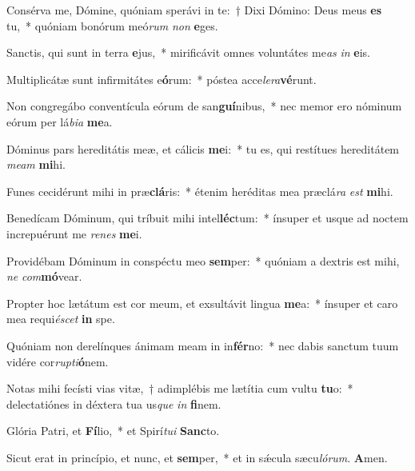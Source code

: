 \item Consérva me, Dómine, quóniam sperávi in te:~† Dixi Dómino: Deus meus \textbf{es} tu,~* quóniam bonórum meó\textit{rum} \textit{non} \textbf{e}ges.
\item Sanctis, qui sunt in terra \textbf{e}jus,~* mirificávit omnes voluntátes me\textit{as} \textit{in} \textbf{e}is.
\item Multiplicátæ sunt infirmitátes e\textbf{ó}rum:~* póstea acce\textit{le}\textit{ra}\textbf{vé}runt.
\item Non congregábo conventícula eórum de san\textbf{guí}nibus,~* nec memor ero nóminum eórum per lá\textit{bi}\textit{a} \textbf{me}a.
\item Dóminus pars hereditátis meæ, et cálicis \textbf{me}i:~* tu es, qui restítues hereditátem \textit{me}\textit{am} \textbf{mi}hi.
\item Funes cecidérunt mihi in præ\textbf{clá}ris:~* étenim heréditas mea præclá\textit{ra} \textit{est} \textbf{mi}hi.
\item Benedícam Dóminum, qui tríbuit mihi intel\textbf{léc}tum:~* ínsuper et usque ad noctem increpuérunt me \textit{re}\textit{nes} \textbf{me}i.
\item Providébam Dóminum in conspéctu meo \textbf{sem}per:~* quóniam a dextris est mihi, \textit{ne} \textit{com}\textbf{mó}vear.
\item Propter hoc lætátum est cor meum, et exsultávit lingua \textbf{me}a:~* ínsuper et caro mea requi\textit{é}\textit{scet} \textbf{in} spe.
\item Quóniam non derelínques ánimam meam in in\textbf{fér}no:~* nec dabis sanctum tuum vidére cor\textit{rup}\textit{ti}\textbf{ó}nem.
\item Notas mihi fecísti vias vitæ,~† adimplébis me lætítia cum vultu \textbf{tu}o:~* delectatiónes in déxtera tua us\textit{que} \textit{in} \textbf{fi}nem.
\item Glória Patri, et \textbf{Fí}lio,~* et Spirí\textit{tu}\textit{i} \textbf{Sanc}to.
\item Sicut erat in princípio, et nunc, et \textbf{sem}per,~* et in sǽcula sæcu\textit{ló}\textit{rum}. \textbf{A}men.
